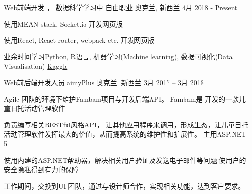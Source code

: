 
\begin{cventries}
	\cventry
	{Web前端开发 ， 数据科学学习中}
	{自由职业}
	{奥克兰, \enskip 新西兰}
	{4月 2018 - Present}
	{
		\begin{cvitems}
			\item {使用MEAN stack, Socket.io 开发网页版\href{https://github.com/ChenMu1/chatroom}{\color{deepblue}{在线聊天室}}
			\item{使用React, React router, webpack etc. 开发网页版\href{https://github.com/ChenMu1/amazing-react-app}{\color{deepblue}{前端单页管理仪表板}} 
			\item{业余时间学习Python, R语言, 机器学习(Machine learning), 数据可视化(Data Visualisation) \quad  \href{https://www.kaggle.com/chenmu1/kernels}{\color{deepblue} {Kaggle} }
		}
	 }
		}
		\end{cvitems}
	}
\end{cventries}

\begin{cventries}
	\cventry
	{Web前后端开发人员}
	{\href{http://www.aimyplus.com/about}{aimyPlus}}
	{奥克兰, \enskip 新西兰}
	{3月 2017 – 3月 2018}
	{
		\begin{cvitems}
			\item{Agile 团队的环境下维护Fambam项目与开发后端API。 Fambam是 \href{http://www.aimyplus.com}{\color{deepblue}{aimyPlus}}开发的一款儿童日托活动管理软件}
			\item {负责编写相关RESTful风格API， 让其他应用程序来调用，形成生态，让儿童日托活动管理软件发挥最大的价值，从而提高系统的维护性和扩展性。 主用ASP.NET 5}
			\item{使用内建的ASP.NET帮助器，解决相关用户验证及发送电子邮件等问题,使用户的安全隐私得到有力的保障}
			\item {工作期间，交换到UI 团队，通过与设计师合作，实现相关功能，达到客户要求。}
		\end{cvitems}
	}
\end{cventries}



